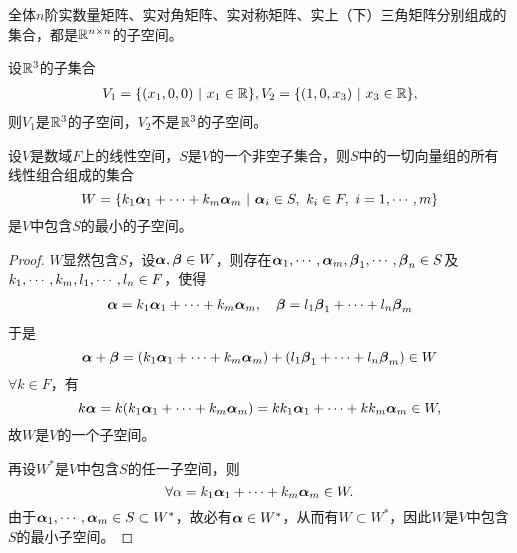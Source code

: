 \begin{frame}
\begin{li}
  全体$n$阶实数量矩阵、实对角矩阵、实对称矩阵、实上（下）三角矩阵分别组成的集合，都是$\mathbb R^{n\times n}$的子空间。
\end{li}
\end{frame}

\begin{frame}
  \begin{li}
    设$\mathbb R^3$的子集合
    $$
    \begin{array}{l}
      V_1=\{(x_1,0,0)~|~x_1\in \mathbb R\},
      V_2=\{(1,0,x_3)~|~x_3\in \mathbb R\},
    \end{array}
    $$
    则$V_1$是$\mathbb R^3$的子空间，$V_2$不是$\mathbb R^3$的子空间。 \vspace{.1in}
    \pause 

  \end{li}
\end{frame}

\begin{frame}
  \begin{dingli}
    设$V$是数域$F$上的线性空间，$S$是$V$的一个非空子集合，则$S$中的一切向量组的所有线性组合组成的集合
    $$
    W = \{k_1\boldsymbol{\alpha}_1+\cdots+k_m\boldsymbol{\alpha}_m~|~\boldsymbol{\alpha}_i\in S, ~k_i\in F, ~i=1,\cdots,m\}
    $$
    是$V$中包含$S$的最小的子空间。
  \end{dingli}\pause 
  \begin{proof}
    $W$显然包含$S$，设$\boldsymbol{\alpha},\boldsymbol{\beta}\in W$，则存在$\boldsymbol{\alpha}_1,\cdots,\boldsymbol{\alpha}_m,\boldsymbol{\beta}_1,\cdots,\boldsymbol{\beta}_n\in S$及$k_1,\cdots,k_m,l_1,\cdots,l_n\in F$，使得
    $$
    \begin{array}{l}
      \boldsymbol{\alpha} = k_1\boldsymbol{\alpha}_1+\cdots+k_m\boldsymbol{\alpha}_m, \quad 
      \boldsymbol{\beta} = l_1\boldsymbol{\beta}_1+\cdots+l_n\boldsymbol{\beta}_m
    \end{array}
    $$
    于是
    $$
    \boldsymbol{\alpha}+\boldsymbol{\beta}=(k_1\boldsymbol{\alpha}_1+\cdots+k_m\boldsymbol{\alpha}_m)+(l_1\boldsymbol{\beta}_1+\cdots+l_n\boldsymbol{\beta}_m)\in W
    $$
    $\forall k\in F$，有
    $$
    k\boldsymbol{\alpha}=k(k_1\boldsymbol{\alpha}_1+\cdots+k_m\boldsymbol{\alpha}_m)=kk_1\boldsymbol{\alpha}_1+\cdots+kk_m\boldsymbol{\alpha}_m\in W,
    $$
    故$W$是$V$的一个子空间。
    \vspace{.1in}\pause
    
    再设$W^*$是$V$中包含$S$的任一子空间，则
    $$
    \forall \alpha = k_1\boldsymbol{\alpha}_1+\cdots+k_m\boldsymbol{\alpha}_m \in W.
    $$
    由于$\boldsymbol{\alpha}_1,\cdots,\boldsymbol{\alpha}_m\in S\subset W^*$，故必有$\boldsymbol{\alpha}\in W^*$，从而有$W\subset W^*$，因此$W$是$V$中包含$S$的最小子空间。
  \end{proof}
\end{frame}

